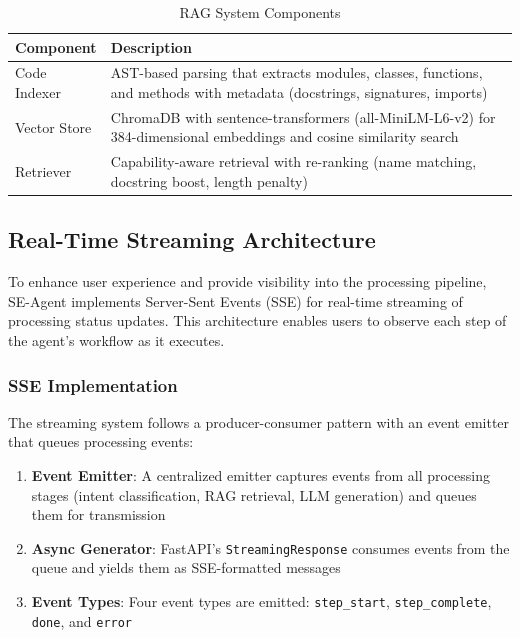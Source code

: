 \documentclass[12pt,a4paper]{article}
\begin{document}
\begin{table}[H]
\centering
\caption{RAG System Components}
\begin{tabular}{lp{8cm}}
\toprule
\textbf{Component} & \textbf{Description} \\
\midrule
Code Indexer & AST-based parsing that extracts modules, classes, functions, and methods with metadata (docstrings, signatures, imports) \\
Vector Store & ChromaDB with sentence-transformers (all-MiniLM-L6-v2) for 384-dimensional embeddings and cosine similarity search \\
Retriever & Capability-aware retrieval with re-ranking (name matching, docstring boost, length penalty) \\
\bottomrule
\end{tabular}
\label{tab:rag}
\end{table}

\subsection{Real-Time Streaming Architecture}

To enhance user experience and provide visibility into the processing pipeline, SE-Agent implements Server-Sent Events (SSE) for real-time streaming of processing status updates. This architecture enables users to observe each step of the agent's workflow as it executes.

\subsubsection{SSE Implementation}

The streaming system follows a producer-consumer pattern with an event emitter that queues processing events:

\begin{enumerate}
    \item \textbf{Event Emitter}: A centralized emitter captures events from all processing stages (intent classification, RAG retrieval, LLM generation) and queues them for transmission
    \item \textbf{Async Generator}: FastAPI's \texttt{StreamingResponse} consumes events from the queue and yields them as SSE-formatted messages
    \item \textbf{Event Types}: Four event types are emitted: \texttt{step\_start}, \texttt{step\_complete}, \texttt{done}, and \texttt{error}
\end{enumerate}
\end{document}
